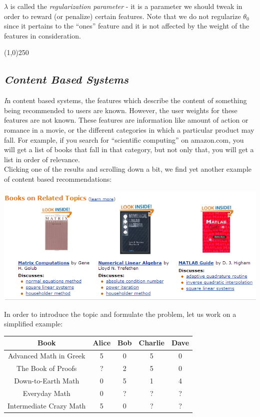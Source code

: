\documentclass[11pt,a4paper,oneside]{report}
\begin{document}
$\lambda$ is called the \emph{regularization parameter} - it is a parameter we should tweak in order to reward (or penalize) certain features. Note that we do not regularize $\theta_0$ since it pertains to the ``ones'' feature and it is not affected by the weight of the features in consideration.

\begin{center}
\line(1,0){250}
\end{center}

{\center\color{magenta}
\subsection*{\it\huge Content Based Systems}}

{\it\huge I}n content based systems, the features which describe the content of something being recommended to users are known. However, the user weights for these features are not known. These features are information like amount of action or romance in a movie, or the different categories in which a particular product may fall. For example, if you search for ``scientific computing'' on amazon.com, you will get a list of books that fall in that category, but not only that, you will get a list in order of relevance. \\

Clicking one of the results and scrolling down a bit, we find yet another example of content based recommendations:

\begin{center}
\includegraphics[scale=1]{cb.png}
\end{center}
\newpage

In order to introduce the topic and formulate the problem, let us work on a simplified example:

\begin{center}
\begin{tabular}{| c | c | c | c | c |}
\hline
Book & Alice & Bob & Charlie & Dave \\
\hline
Advanced Math in Greek & 5 & 0 & 5 & 0\\
\hline
The Book of Proofs & ? & 2 & 5 & 0\\
\hline
Down-to-Earth Math & 0 & 5 & 1 & 4\\
\hline
Everyday Math & 0 & ? & ? & ? \\
\hline
Intermediate Crazy Math & 5 & 0 & ? & ?\\
\hline
\end{tabular}
\end{center}
\end{document}
